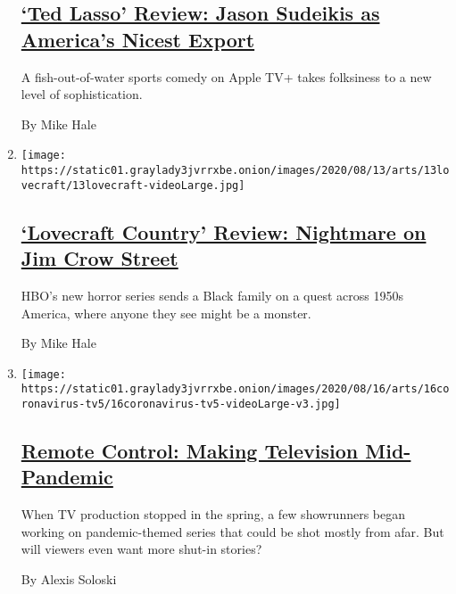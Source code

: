 \begin{enumerate}
  \hypertarget{ted-lasso-review-jason-sudeikis-as-americas-nicest-export}{%
  \subsection{\texorpdfstring{\href{/2020/08/14/arts/television/ted-lasso-review.html}{`Ted
  Lasso' Review: Jason Sudeikis as America's Nicest
  Export}}{`Ted Lasso' Review: Jason Sudeikis as America's Nicest Export}}\label{ted-lasso-review-jason-sudeikis-as-americas-nicest-export}}

  A fish-out-of-water sports comedy on Apple TV+ takes folksiness to a
  new level of sophistication.

  By Mike Hale
\item
  \texttt{[image: https://static01.graylady3jvrrxbe.onion/images/2020/08/13/arts/13lovecraft/13lovecraft-videoLarge.jpg]}

  \hypertarget{lovecraft-country-review-nightmare-on-jim-crow-street}{%
  \subsection{\texorpdfstring{\href{/2020/08/13/arts/television/lovecraft-country-review.html}{`Lovecraft
  Country' Review: Nightmare on Jim Crow
  Street}}{`Lovecraft Country' Review: Nightmare on Jim Crow Street}}\label{lovecraft-country-review-nightmare-on-jim-crow-street}}

  HBO's new horror series sends a Black family on a quest across 1950s
  America, where anyone they see might be a monster.

  By Mike Hale
\item
  \texttt{[image: https://static01.graylady3jvrrxbe.onion/images/2020/08/16/arts/16coronavirus-tv5/16coronavirus-tv5-videoLarge-v3.jpg]}

  \hypertarget{remote-control-making-television-mid-pandemic}{%
  \subsection{\texorpdfstring{\href{/2020/08/12/arts/television/coastal-elites-connecting-social-distance.html}{Remote
  Control: Making Television
  Mid-Pandemic}}{Remote Control: Making Television Mid-Pandemic}}\label{remote-control-making-television-mid-pandemic}}

  When TV production stopped in the spring, a few showrunners began
  working on pandemic-themed series that could be shot mostly from afar.
  But will viewers even want more shut-in stories?

  By Alexis Soloski
\end{enumerate}

